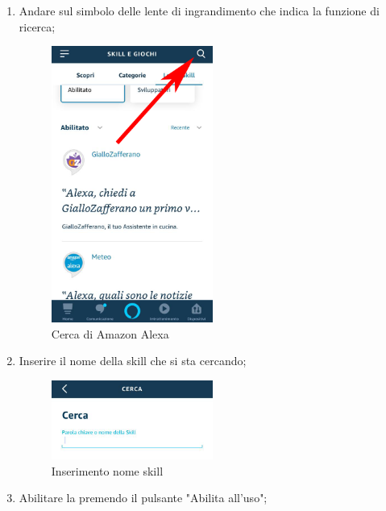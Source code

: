 \begin{itemize}
\begin{enumerate}
	\item Andare sul simbolo delle lente di ingrandimento che indica la funzione di ricerca;
	\begin{figure}[H]
		\centering
		\includegraphics[width=0.5\textwidth]{images/SimboloCerca.png}
		\caption{Cerca di Amazon Alexa}
	\end{figure}
	\item Inserire il nome della skill che si sta cercando;
	\begin{figure}[!ht]
	\centering
	\includegraphics[width=0.5\textwidth]{images/CercaSkill.png}
	\caption{Inserimento nome skill}
   \end{figure}
\newpage
    \item Abilitare la  premendo il pulsante "Abilita all'uso";
    

\end{enumerate}
\end{itemize}
